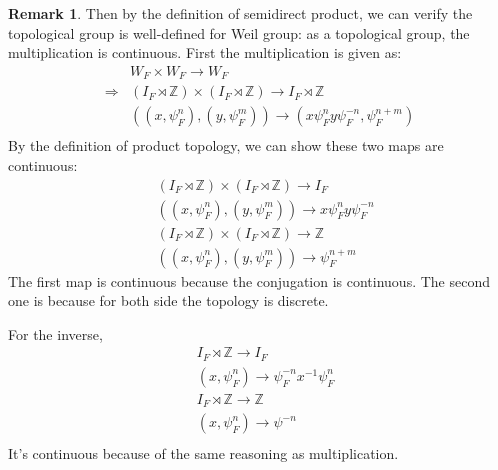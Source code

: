 \documentclass[12pt,a4paper,english]{article}
\theoremstyle{definition}
\newtheorem*{rem}{Remark}
\theoremstyle{plain}
\begin{document}
\begin{rem}
Then by the definition of semidirect product, we can  verify the topological group is well-defined for Weil group: as a topological group, the multiplication is continuous. First the multiplication is given as:
\begin{align*}
    &W_{F}\times W_{F}\rightarrow W_{F}\\
    \Rightarrow &(I_{F}\rtimes\mathbb{Z})\times (I_{F}\rtimes\mathbb{Z})\rightarrow I_{F}\rtimes \mathbb{Z}\\
&((x,\psi^{n}_{F}),(y,\psi^{m}_{F}))\rightarrow (x\psi^{n}_{F}y\psi^{-n}_{F},\psi^{n+m}_{F})\\
\end{align*}
By the definition of product topology, we can show these two maps are continuous:
\begin{align*}
& (I_{F}\rtimes\mathbb{Z})\times (I_{F}\rtimes\mathbb{Z})\rightarrow I_{F}\\
&((x,\psi^{n}_{F}),(y,\psi^{m}_{F}))\rightarrow x\psi^{n}_{F}y\psi^{-n}_{F}\\
& (I_{F}\rtimes\mathbb{Z})\times (I_{F}\rtimes\mathbb{Z})\rightarrow\mathbb{Z}\\
&((x,\psi^{n}_{F}),(y,\psi^{m}_{F}))\rightarrow \psi^{n+m}_{F}
\end{align*}
The first map is continuous because the conjugation is continuous. The second one is because for both side the topology is discrete. 

For the inverse,
\begin{align*}
    & I_{F}\rtimes\mathbb{Z}\rightarrow I_{F}\\
    &(x,\psi_{F}^{n})\rightarrow \psi^{-n}_{F}x^{-1}\psi^{n}_{F}\\
 & I_{F}\rtimes\mathbb{Z}\rightarrow \mathbb{Z}\\
    &(x,\psi^{n}_{F})\rightarrow \psi^{-n}\\
\end{align*}
It's continuous because of the same reasoning as multiplication.
\end{rem}
\end{document}
